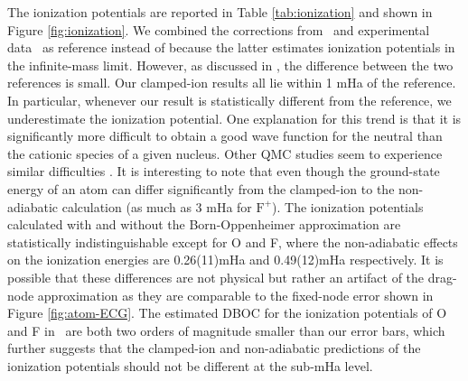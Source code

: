 \documentclass[pra,superscriptaddress,groupedaddress,twocolumn]{revtex4}
\begin{document}

The ionization potentials are reported in Table \ref{tab:ionization} and shown in Figure \ref{fig:ionization}. We combined the corrections from~\cite{Klopper_IP} and experimental data~\cite{NIST_Atoms} as reference instead of \cite{Davidson_Atoms} because the latter estimates ionization potentials in the infinite-mass limit. However, as discussed in \cite{Seth_Bench}, the difference between the two references is small. Our clamped-ion results all lie within 1 mHa of the reference. In particular, whenever our result is statistically different from the reference, we underestimate the ionization potential. One explanation for this trend is that it is significantly more difficult to obtain a good wave function for the neutral than the cationic species of a given nucleus. Other QMC studies seem to experience similar difficulties \cite{Seth_Bench,Booth_FCIQMC,Brown_Bench}. It is interesting to note that even though the ground-state energy of an atom can differ significantly from the clamped-ion to the non-adiabatic calculation (as much as 3 mHa for $\text{F}^+$). The ionization potentials calculated with and without the Born-Oppenheimer approximation are statistically indistinguishable except for O and F, where the non-adiabatic effects on the ionization energies are 0.26(11)mHa and 0.49(12)mHa respectively. It is possible that these differences are not physical but rather an artifact of the drag-node approximation as they are comparable to the fixed-node error shown in Figure \ref{fig:atom-ECG}. The estimated DBOC for the ionization potentials of O and F in~\cite{Klopper_IP} are both two orders of magnitude smaller than our error bars, which further suggests that the clamped-ion and non-adiabatic predictions of the ionization potentials should not be different at the sub-mHa level.
\end{document}

